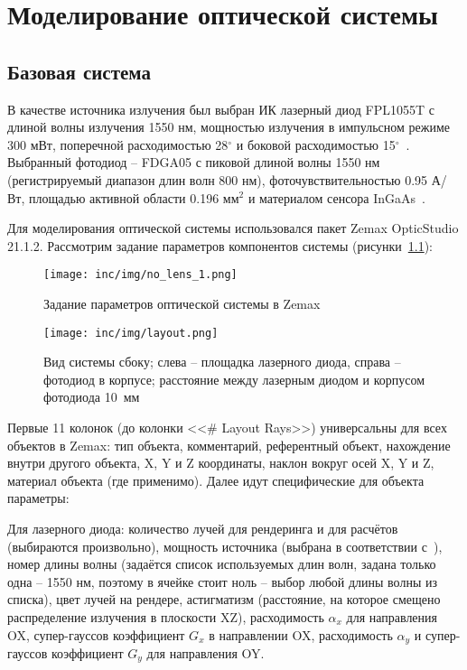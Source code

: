 \chapter{Моделирование оптической системы}
\label{ch:zemax}

\section{Базовая система}
\label{sec:basic_system}

В качестве источника излучения был выбран ИК лазерный диод FPL1055T с длиной волны излучения 1550 нм, мощностью излучения в импульсном режиме 300 мВт, поперечной расходимостью 28${}^\circ$ и боковой расходимостью 15${}^\circ$~\cite{LDThorlabs}. Выбранный фотодиод \--- FDGA05 с пиковой длиной волны 1550 нм (регистрируемый диапазон длин волн 800 нм), фоточувствительностью 0.95 А/Вт, площадью активной области 0.196 мм${}^2$ и материалом сенсора InGaAs~\cite{PDThorlabs}.

Для моделирования оптической системы использовался пакет Zemax OpticStudio 21.1.2. Рассмотрим задание параметров компонентов системы (рисунки~\ref{fig:no_lens_zemax_1}):

\begin{figure}[!h]
    \centering
    \texttt{[image: inc/img/no\_lens\_1.png]}
    \caption{Задание параметров оптической системы в Zemax}
    \label{fig:no_lens_zemax_1}
\end{figure}

\begin{figure}[!h]
    \centering
    \texttt{[image: inc/img/layout.png]}
    \caption{Вид системы сбоку; слева \--- площадка лазерного диода, справа \--- фотодиод в корпусе; расстояние между лазерным диодом и корпусом фотодиода 10~мм}
    \label{fig:layout}
\end{figure}

Первые 11 колонок (до колонки <<\# Layout Rays>>) универсальны для всех объектов в Zemax: тип объекта, комментарий, референтный объект, нахождение внутри другого объекта, X, Y и Z координаты, наклон вокруг осей X, Y и Z, материал объекта (где применимо). Далее идут специфические для объекта параметры:

Для лазерного диода: количество лучей для рендеринга и для расчётов (выбираются произвольно), мощность источника (выбрана в соответствии с~\cite{LDThorlabs}), номер длины волны (задаётся список используемых длин волн, задана только одна \--- 1550 нм, поэтому в ячейке стоит ноль \--- выбор любой длины волны из списка), цвет лучей на рендере, астигматизм (расстояние, на которое смещено распределение излучения в плоскости XZ), расходимость $\alpha_x$ для направления OX, супер-гауссов коэффициент $G_x$ в направлении OX, расходимость $\alpha_y$ и супер-гауссов коэффициент $G_y$ для направления OY. 

